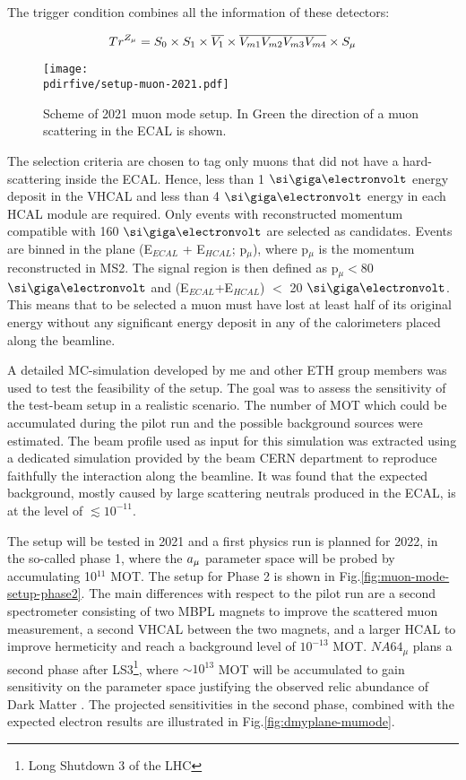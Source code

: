 The trigger condition combines all the information of these detectors:

\begin{equation}
\label{eq:trigger-mumode}
Tr^{Z_{\mu}} = S_0 \times S_1 \times \overline{V_1} \times \overline{V_{m1}}\overline{V_{m2}}\overline{V_{m3}}\overline{V_{m4}}\times S_{\mu}
\end{equation}

\begin{figure}[bth!]
  \centering
  \texttt{[image: \\pdirfive/setup-muon-2021.pdf]}
  \caption[Sketch of muon mode setup 2021 for phase 1]{Scheme of 2021 muon mode setup. In Green the direction of a muon scattering in the ECAL is shown.}
  \label{fig:muon-mode-setup}
\end{figure}

The selection criteria are chosen to tag only muons that did not have a hard-scattering inside the ECAL. Hence, less than 1 $\gev$ energy deposit in the VHCAL and less than 4 $\gev$ energy in each HCAL module are required. Only events with reconstructed momentum compatible with 160 $\gev$ are selected as candidates. Events are binned in the plane (E$_{ECAL}$ + E$_{HCAL}$; p$_{\mu}$), where p$_{\mu}$ is the momentum reconstructed in MS2. The signal region is then defined as p$_{\mu} <$80 $\gev$ and (E$_{ECAL}$+E$_{HCAL}$) $<$ 20 $\gev$. This means that to be selected a muon must have lost at least half of its original energy without any significant energy deposit in any of the calorimeters placed along the beamline.

A detailed MC-simulation developed by me and other ETH group members was used to test the feasibility of the setup. The goal was to assess the sensitivity of the test-beam setup in a realistic scenario. The number of MOT which could be accumulated during the pilot run and the possible background sources were estimated. The beam profile used as input for this simulation was extracted using a dedicated simulation provided by the beam CERN department to reproduce faithfully the interaction along the beamline. It was found that the expected background, mostly caused by large scattering neutrals produced in the ECAL, is at the level of $\lesssim 10^{-11}$. 

The setup will be tested in 2021 and a first physics run is planned for 2022, in the so-called phase 1, where the $a_{\mu}$ parameter space will be probed by accumulating 10$^{11}$ MOT. The setup for Phase 2 is shown in Fig.\ref{fig:muon-mode-setup-phase2}. The main differences with respect to the pilot run are a second spectrometer consisting of two MBPL magnets to improve the scattered muon measurement, a second VHCAL between the two magnets, and a larger HCAL to improve hermeticity and reach a background level of $10^{-13}$ MOT. $NA64_{\mu}$ plans a second phase after LS3\footnote{Long Shutdown 3 of the LHC}, where $\sim 10^{13}$ MOT will be accumulated to gain sensitivity on the parameter space justifying the observed relic abundance of Dark Matter \cite{Gninenko:2640930}. The projected sensitivities in the second phase, combined with the expected electron results are illustrated in Fig.\ref{fig:dmyplane-mumode}.


